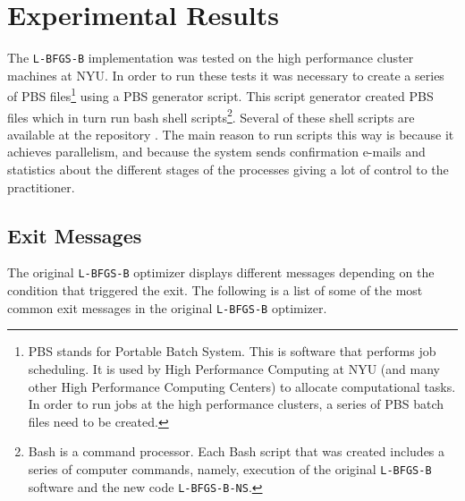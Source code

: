 \chapter{Experimental Results}

The \texttt{L-BFGS-B} implementation was tested on the high performance cluster machines at NYU. In order to run these tests it was necessary to create a series of PBS files\footnote{PBS stands for Portable Batch System. This is software that performs job scheduling. It is used by High Performance Computing at NYU (and many other High Performance Computing Centers) to allocate computational tasks. In order to run jobs at the high performance clusters, a series of PBS batch files need to be created.} using a PBS generator script. This script generator created PBS files which in turn run bash shell scripts\footnote{Bash is a command processor. Each Bash script that was created includes a series of computer commands, namely, execution of the original \texttt{L-BFGS-B} software and the new code \texttt{L-BFGS-B-NS}.}. Several of these shell scripts are available at the repository \citep{lbfgsbNS}. The main reason to run scripts this way is because it achieves parallelism, and because the system sends confirmation e-mails and statistics about the different stages of the processes giving a lot of control to the practitioner.

\section{Exit Messages}

The original \texttt{L-BFGS-B} optimizer displays different messages depending on the condition that triggered the exit. The following is a list of some of the most common exit messages in the original \texttt{L-BFGS-B} optimizer.

